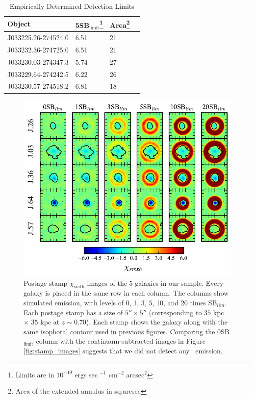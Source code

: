 \documentclass[twocolumn]{aastex61}
\begin{document}
\begin{table}[]
\centering
\caption{Empirically Determined Detection Limits \label{tab:det_lims}}  
\begin{tabular}{llll} \hline \hline
Object & 5SB$_{\text{limit}}$\footnote{Limits are in $10^{-19}$ ergs sec $^{-1}$ cm$^{-2}$ arcsec$^2$} &Area\footnote{Area of the extended annulus in sq.arcsec} \\  \hline
J033225.26-274524.0 &  6.51 & 21 \\
J033232.36-274725.0 & 6.51 & 21 \\
J033230.03-274347.3 & 5.74 & 27 \\
J033229.64-274242.5 & 6.22  & 26 \\
J033230.57-274518.2 & 6.81 & 18 \\ \hline
\end{tabular}
\end{table}

\begin{figure}[p]
\centering
\includegraphics[scale=1.2]{../Figures/sigmas.pdf}
\caption{Postage stamp $\chi_{\text{smth}}$ images of the 5 galaxies in our sample. Every galaxy is placed in the same row in each column. The columns show simulated emission, with levels of 0, 1, 3, 5, 10, and 20 times SB$_{lim}$.  Each postage stamp has a size of $5'' \times 5''$ (corresponding to $35$ kpc $\times$ $35$ kpc at $z\sim 0.70$). Each stamp shows the galaxy along with the same isophotal contour used in previous figures. Comparing the $0$SB$_{\text{limit}}$ column with the continuum-subtracted images in Figure \ref{fig:stamp_images} suggests that we did not detect any \ emission.}
\label{fig:sigmas}
\end{figure}
\end{document}
